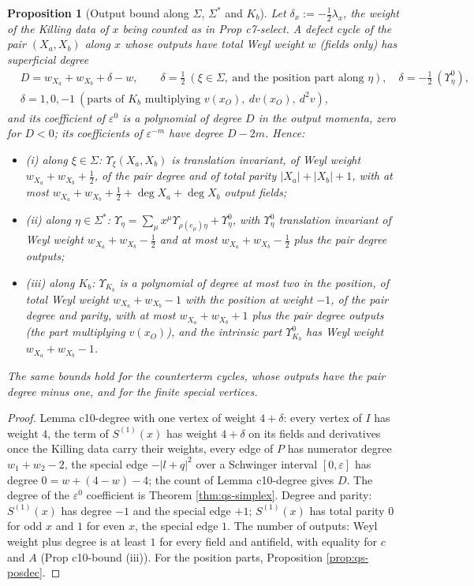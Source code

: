 \documentclass[11pt]{article}
\numberwithin{equation}{section}
\theoremstyle{plain}
\newtheorem{proposition}[theorem]{Proposition}
\theoremstyle{definition}
\begin{document}
\begin{proposition}[Output bound along $\Sigma$, $\Sigma^*$ and $K_b$]
\label{prop:qs-bound}
Let $\delta_x:=-\tfrac12\lambda_x$, the weight of the Killing data of $x$ being counted as in Prop c7-select. A defect cycle of the pair $(X_a,X_b)$ along $x$ whose outputs have total Weyl weight $w$ (fields only) has superficial degree
\[
\begin{aligned}
&D=w_{X_a}+w_{X_b}+\delta-w,\qquad \delta=\tfrac12\ (\xi\in\Sigma,\ \text{and the position part along }\eta),\quad \delta=-\tfrac12\ (\Upsilon^0_\eta),\\
&\delta=1,0,-1\ (\text{parts of }K_b\text{ multiplying }v(x_O),\ dv(x_O),\ d^2v),
\end{aligned}
\]
and its coefficient of $\varepsilon^0$ is a polynomial of degree $D$ in the output momenta, zero for $D<0$; its coefficients of $\varepsilon^{-m}$ have degree $D-2m$. Hence:
\begin{itemize}
\item (i) along $\xi\in\Sigma$: $\Upsilon_\xi(X_a,X_b)$ is translation invariant, of Weyl weight $w_{X_a}+w_{X_b}+\tfrac12$, of the pair degree and of total parity $|X_a|+|X_b|+1$, with at most $w_{X_a}+w_{X_b}+\tfrac12+\deg X_a+\deg X_b$ output fields;
\item (ii) along $\eta\in\Sigma^*$: $\Upsilon_\eta=\sum_\mu x^\mu\Upsilon_{\rho(e_\mu)\eta}+\Upsilon^0_\eta$, with $\Upsilon^0_\eta$ translation invariant of Weyl weight $w_{X_a}+w_{X_b}-\tfrac12$ and at most $w_{X_a}+w_{X_b}-\tfrac12$ plus the pair degree outputs;
\item (iii) along $K_b$: $\Upsilon_{K_b}$ is a polynomial of degree at most two in the position, of total Weyl weight $w_{X_a}+w_{X_b}-1$ with the position at weight $-1$, of the pair degree and parity, with at most $w_{X_a}+w_{X_b}+1$ plus the pair degree outputs (the part multiplying $v(x_O)$), and the intrinsic part $\Upsilon^0_{K_b}$ has Weyl weight $w_{X_a}+w_{X_b}-1$.
\end{itemize}
The same bounds hold for the counterterm cycles, whose outputs have the pair degree minus one, and for the finite special vertices.
\end{proposition}

\begin{proof}
Lemma c10-degree with one vertex of weight $4+\delta$: every vertex of $I$ has weight $4$, the term of $S^{(1)}(x)$ has weight $4+\delta$ on its fields and derivatives once the Killing data carry their weights, every edge of $P$ has numerator degree $w_1+w_2-2$, the special edge $-|l+q|^2$ over a Schwinger interval $[0,\varepsilon]$ has degree $0=w+(4-w)-4$; the count of Lemma c10-degree gives $D$. The degree of the $\varepsilon^0$ coefficient is Theorem \ref{thm:qs-simplex}. Degree and parity: $S^{(1)}(x)$ has degree $-1$ and the special edge $+1$; $S^{(1)}(x)$ has total parity $0$ for odd $x$ and $1$ for even $x$, the special edge $1$. The number of outputs: Weyl weight plus degree is at least $1$ for every field and antifield, with equality for $c$ and $A$ (Prop c10-bound (iii)). For the position parts, Proposition \ref{prop:qs-posdec}.
\end{proof}
\end{document}
